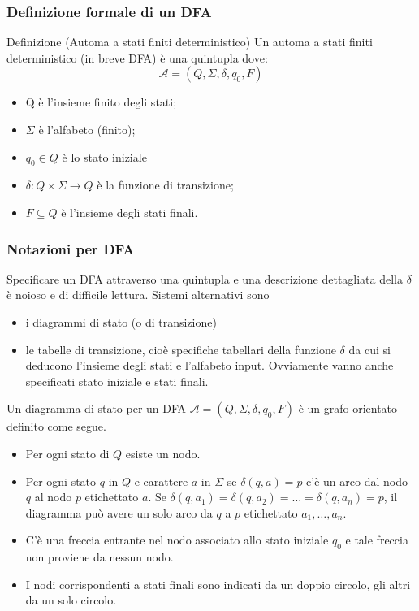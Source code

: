 \subsubsection{Definizione formale di un DFA}
Definizione (Automa a stati finiti deterministico)
Un automa a stati finiti deterministico (in breve DFA) è una quintupla
dove:
$$
\mathcal{A}=\left(Q, \Sigma, \delta, q_{0}, F\right)
$$
\begin{itemize}
    \item Q è l'insieme finito degli stati;
    \item  $\Sigma$ è l'alfabeto (finito);
    \item $q_{0} \in Q$ è lo stato iniziale
    \item $\delta: Q \times \Sigma \rightarrow Q$ è la funzione di transizione;
    \item $F \subseteq Q$ è l'insieme degli stati finali.
\end{itemize}

\subsubsection{Notazioni per DFA}

Specificare un DFA attraverso una quintupla e una descrizione dettagliata della $\delta$ è noioso e di difficile lettura. Sistemi alternativi sono
\begin{itemize}
    \item i diagrammi di stato (o di transizione)
    \item le tabelle di transizione, cioè specifiche tabellari della funzione $\delta$ da cui si deducono l'insieme degli stati e l'alfabeto input. Ovviamente vanno anche specificati stato iniziale e stati finali.
\end{itemize}

Un diagramma di stato per un DFA $\mathcal{A}=\left(Q, \Sigma, \delta, q_{0}, F\right)$ è un grafo orientato definito come segue.
\begin{itemize}
    \item Per ogni stato di $Q$ esiste un nodo.
    \item Per ogni stato $q$ in $Q$ e carattere $a$ in $\Sigma$ se $\delta(q, a)=p$ c'è un arco dal nodo $q$ al nodo $p$ etichettato $a$.
Se $\delta\left(q, a_{1}\right)=\delta\left(q, a_{2}\right)=\ldots=\delta\left(q, a_{n}\right)=p$, il diagramma può avere un solo arco da $q$ a $p$ etichettato $a_{1}, \ldots, a_{n}$.
    \item C'è una freccia entrante nel nodo associato allo stato iniziale $q_{0}$ e tale freccia non proviene da nessun nodo.
    \item I nodi corrispondenti a stati finali sono indicati da un doppio circolo, gli altri da un solo circolo.
    
\end{itemize}

